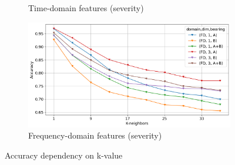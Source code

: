 \begin{figure}[h]
\begin{subfigure}[b]{0.48\textwidth}
        \caption{Time-domain features (severity)}
    \end{subfigure}
    \hfill
    \begin{subfigure}[b]{0.48\textwidth}
        \includegraphics[width=\textwidth]{assets/results/all-features/FD-severity.png}
        \caption{Frequency-domain features (severity)}
    \end{subfigure} 
    \caption{Accuracy dependency on k-value}
\end{figure}


